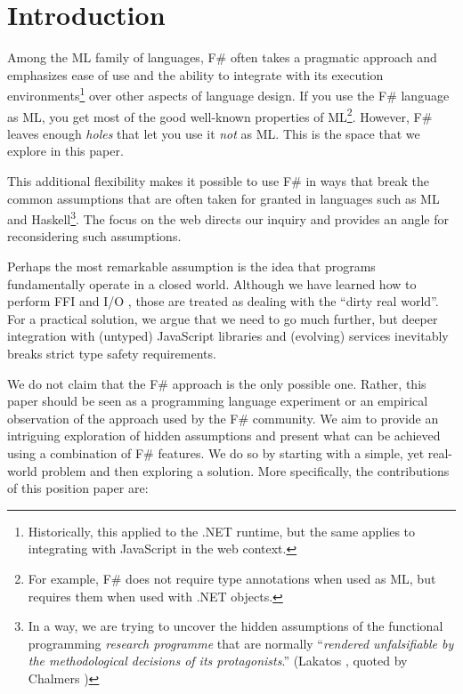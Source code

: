 \documentclass[submission,copyright,creativecommons]{eptcs}
\begin{document}
\section{Introduction}

Among the ML family of languages, F\# often takes a pragmatic approach and emphasizes ease of use
and the ability to integrate with its execution environments\footnote{Historically, this applied
to the .NET runtime, but the same applies to integrating with JavaScript in the web context.} over
other aspects of language design. If you use the F\# language as ML, you get most of the good
well-known properties of ML\footnote{For example, F\# does not require type annotations when used
as ML, but requires them when used with .NET objects.}. However, F\# leaves enough \emph{holes} that
let you use it \emph{not} as ML. This is the space that we explore in this paper.

This additional flexibility makes it possible to use F\# in ways that break the common assumptions
that are often taken for granted in languages such as ML and Haskell\footnote{In a way, we are trying
to uncover the hidden assumptions of the functional programming \emph{research programme} that are
normally ``\emph{rendered unfalsifiable by the methodological decisions of its protagonists}.''
(Lakatos \cite{philosophy-lakatos}, quoted by Chalmers \cite{philosophy-thing})}. The focus on
the web directs our inquiry and provides an angle for reconsidering such assumptions.

Perhaps the most remarkable assumption is the idea that programs fundamentally operate in a closed
world. Although we have learned how to perform FFI and I/O \cite{haskell-ffi,haskell-imperative},
those are treated as dealing with the ``dirty real world''. For a practical solution, we argue that
we need to go much further, but deeper integration with (untyped) JavaScript libraries and (evolving)
services inevitably breaks strict type safety requirements.

We do not claim that the F\# approach is the only possible one. Rather, this paper should be seen
as a programming language experiment \cite{philosophy-pl} or an empirical observation of the
approach used by the F\# community. We aim to provide an intriguing exploration of hidden assumptions
and present what can be achieved using a combination of F\# features. We do so by starting with
a simple, yet real-world problem and then exploring a solution. More specifically, the contributions
of this position paper are:
\end{document}
